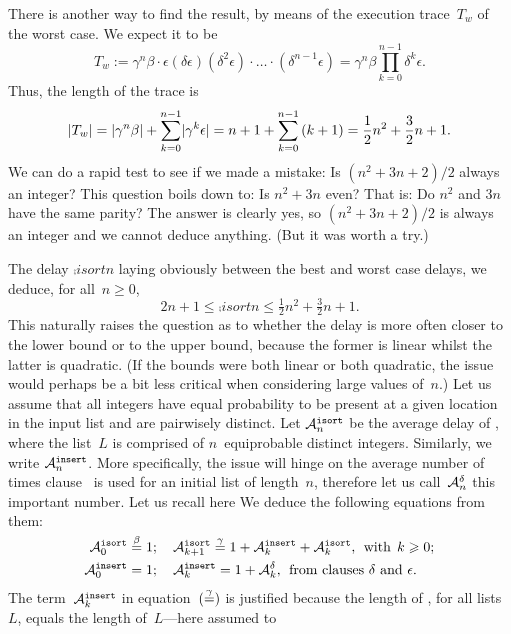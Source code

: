 There is another way to find the result, by means of the execution
trace~\(T_w\) of the worst case. We expect it to be 
\[
T_w := \gamma^n\beta \cdot \epsilon
(\delta\epsilon)(\delta^2\epsilon)
\cdot\ldots\cdot (\delta^{n-1}\epsilon) =
\gamma^n\beta \prod_{k=0}^{n-1}\delta^k\epsilon.
\]
Thus, the length of the trace is
\[
\len{T_w} = \len{\gamma^n\beta} +
\sum_{k=0}^{n-1}\len{\gamma^k\epsilon} = n + 1 +
\sum_{k=0}^{n-1}{(k+1)} = \frac{1}{2}n^2 + \frac{3}{2}n + 1.
\]
We can do a rapid test to see if we made a mistake: Is \((n^2 + 3n +
2)/2\) always an integer? This question boils down to: Is \(n^2 + 3n\)
even? That is: Do \(n^2\) and \(3n\) have the same parity? The answer
is clearly yes, so \((n^2 + 3n + 2)/2\) is always an integer and we
cannot deduce anything. (But it was worth a try.)

The delay \(\comp{isort}{n}\) laying obviously between the best and
worst case delays, we deduce, for all~\(n\geqslant{}0\),
\[
2n + 1 \leqslant \comp{isort}{n} \leqslant \tfrac{1}{2}{n^2} +
\tfrac{3}{2}{n} + 1.
\]
This naturally raises the question as to whether the delay is more
often closer to the lower bound or to the upper bound, because the
former is linear whilst the latter is quadratic. (If the bounds were
both linear or both quadratic, the issue would perhaps be a bit less
critical when considering large values of~\(n\).) Let us assume that
all integers have equal probability to be present at a given location
in the input list and are pairwisely distinct. Let \(\ave{isort}{n}\)
be the average delay of , where the list~\(L\)
is comprised of \(n\)~equiprobable distinct integers. Similarly, we
write \(\ave{insert}{n}\). More specifically, the issue will hinge on
the average number of times clause~\clause{\delta} is used for an
initial list of length~\(n\), therefore let us
call~\(\aveclause{\delta}{n}\) this important number. Let us recall
here  We deduce the following equations from
them:\label{def:ave_isort}
\begin{align*}
\ave{isort}{0}   &\eqn{\beta} 1;\quad
\ave{isort}{k+1} \eqn{\gamma} 1 + \ave{insert}{k} +
              \ave{isort}{k},\,\; \text{with} \;\, k \geqslant 0;\\
\ave{insert}{0} &= 1;\quad 
\ave{insert}{k} = 1 + \aveclause{\delta}{k},
\,\; \text{from clauses \clause{\delta} and \clause{\epsilon}}.
\end{align*}
The term~\(\ave{insert}{k}\) in equation~\((\eqn{\gamma})\) is
justified because the length of , for all
lists~\(L\), equals the length of~\(L\)---here assumed to
